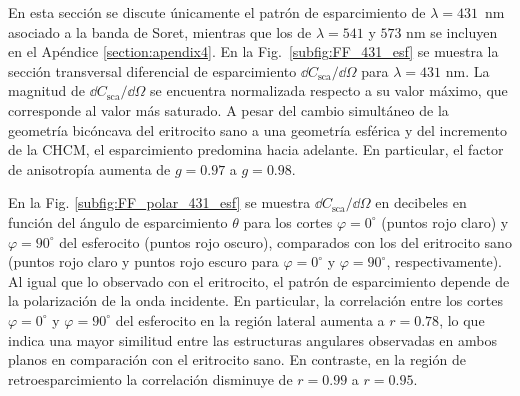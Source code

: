En esta sección se discute únicamente el patrón de esparcimiento de $\lambda=431$~nm asociado a la banda de Soret, mientras que los de $\lambda=541$ y $573$ nm se incluyen en el Apéndice \ref{section:apendix4}. En la Fig.~\ref{subfig:FF_431_esf} se muestra la sección transversal diferencial de esparcimiento $\dd{C_{\text{sca}}}/\dd{\Omega}$ para $\lambda=431$ nm. La magnitud de $\dd{C_{\text{sca}}}/\dd{\Omega}$ se encuentra normalizada respecto a su valor máximo, que corresponde al valor más saturado. A pesar del cambio simultáneo de la geometría bicóncava del eritrocito sano a una geometría esférica y del incremento de la CHCM, el esparcimiento predomina hacia adelante. En particular, el factor de anisotropía aumenta de $g=0.97$ a $g=0.98$.

En la Fig. \ref{subfig:FF_polar_431_esf} se muestra $\dd{C_{\text{sca}}}/\dd{\Omega}$ en decibeles en función del ángulo de esparcimiento $\theta$ para los cortes $\varphi=0^{\circ}$ (puntos rojo claro) y $\varphi=90^{\circ}$ del esferocito (puntos rojo oscuro), comparados con los del eritrocito sano (puntos rojo claro y puntos rojo escuro para $\varphi=0^{\circ}$ y $\varphi=90^{\circ}$, respectivamente). Al igual que lo observado con el eritrocito, el patrón de esparcimiento depende de la polarización de la onda incidente. En particular, la correlación entre los cortes $\varphi=0^{\circ}$  y $\varphi=90^{\circ}$ del esferocito en la región lateral aumenta a $r=0.78$, lo que indica una mayor similitud entre las estructuras angulares observadas en ambos planos en comparación con el eritrocito sano. En contraste, en la región de retroesparcimiento la correlación disminuye de $r=0.99$ a $r=0.95$.

